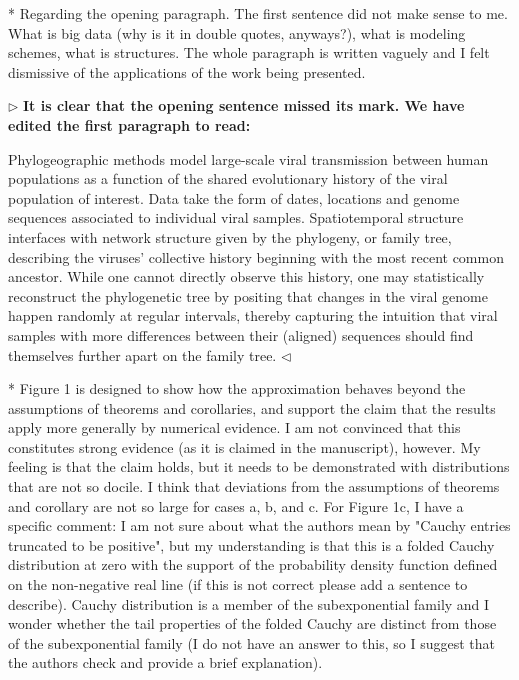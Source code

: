\documentclass[12pt]{article}
\newenvironment{reply}{$\triangleright$\bfseries}{$\triangleleft$}
\renewenvironment{quote}
               {\list{}{\rightmargin\leftmargin}%
                \item\relax\normalfont}
               {\endlist}
\begin{document}
* Regarding the opening paragraph. The first sentence did not make sense to me. What is big data (why is it in double quotes, anyways?), what is modeling schemes, what is structures. The whole paragraph is written vaguely and I felt dismissive of the applications of the work being presented. 

\begin{reply}
	It is clear that the opening sentence missed its mark.  We have edited the first paragraph to read:
	\begin{quote}
		Phylogeographic methods
	\cite{lemey2009bayesian, lemey2014unifying, holbrook2021massive,
	holbrook2022viral} model large-scale viral transmission between
human populations as a function of the shared evolutionary history of
the viral population of interest.  Data take the form of dates,
locations and genome sequences associated to individual viral
samples. Spatiotemporal structure interfaces with network structure
given by the phylogeny, or family tree, describing the viruses'
collective history beginning with the most recent common ancestor.
While one cannot directly observe this history, one may statistically
reconstruct the phylogenetic tree by positing that changes in the
viral genome happen randomly at regular intervals, thereby capturing
the intuition that viral samples with more differences between their
(aligned) sequences should find themselves further apart on the family
tree.
	\end{quote}
\end{reply}

* Figure 1 is designed to show how the approximation behaves beyond the assumptions of theorems and corollaries, and support the claim that the results apply more generally by numerical evidence. I am not convinced that this constitutes strong evidence (as it is claimed in the manuscript), however. My feeling is that the claim holds, but it needs to be demonstrated with distributions that are not so docile. I think that deviations from the assumptions of theorems and corollary are not so large for cases a, b, and c. For Figure 1c, I have a specific comment: I am not sure about what the authors mean by "Cauchy entries truncated to be positive", but my understanding is that this is a folded Cauchy distribution at zero with the support of the probability density function defined on the non-negative real line (if this is not correct please add a sentence to describe). Cauchy distribution is a member of the subexponential family and I wonder whether the tail properties of the folded Cauchy are distinct from those of the subexponential family (I do not have an answer to this, so I suggest that the authors check and provide a brief explanation). 
\end{document}
